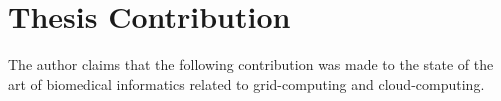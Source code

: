 \begin{itemize}
\end{itemize}

\section{Thesis Contribution}
The author claims that the following contribution was made to the state of the art of biomedical informatics related to grid-computing and cloud-computing.
